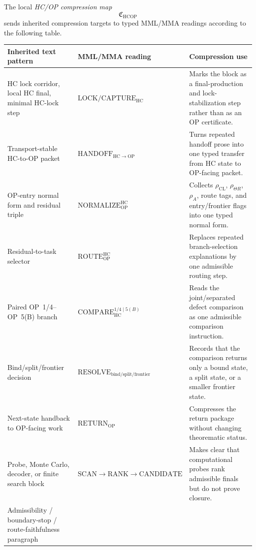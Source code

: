 \begin{definition}
\label{def:compression-map-from-inherited-text-to-mml-mma-operations}
The local \emph{HC/OP compression map}
\[
 \mathfrak C_{\mathrm{HCOP}}
\]
sends inherited compression targets to typed MML/MMA readings according to the following table.

{\small
\renewcommand{\arraystretch}{1.18}
\begin{longtable}{|P{0.28\textwidth}|P{0.24\textwidth}|P{0.36\textwidth}|}
\hline
\textbf{Inherited text pattern} & \textbf{MML/MMA reading} & \textbf{Compression use} \\
\hline
HC lock corridor, local HC final, minimal HC-lock step &
\(\mathrm{LOCK}/\mathrm{CAPTURE}_{\mathrm{HC}}\) &
Marks the block as a final-production and lock-stabilization step rather than as an OP certificate. \\
\hline
Transport-stable HC-to-OP packet &
\(\mathrm{HANDOFF}_{\mathrm{HC}\to\mathrm{OP}}\) &
Turns repeated handoff prose into one typed transfer from HC state to OP-facing packet. \\
\hline
OP-entry normal form and residual triple &
\(\mathrm{NORMALIZE}_{\mathrm{OP}}^{\mathrm{HC}}\) &
Collects \(\rho_{\mathrm{CL}}\), \(\rho_{\Theta R}\), \(\rho_A\), route tags, and entry/frontier flags into one typed normal form. \\
\hline
Residual-to-task selector &
\(\mathrm{ROUTE}_{\mathrm{OP}}^{\mathrm{HC}}\) &
Replaces repeated branch-selection explanations by one admissible routing step. \\
\hline
Paired OP~1/4--OP~5(B) branch &
\(\mathrm{COMPARE}_{\mathrm{HC}}^{1/4\mid 5(B)}\) &
Reads the joint/separated defect comparison as one admissible comparison instruction. \\
\hline
Bind/split/frontier decision &
\(\scriptstyle\mathrm{RESOLVE}_{\mathrm{bind/split/frontier}}\) &
Records that the comparison returns only a bound state, a split state, or a smaller frontier state. \\
\hline
Next-state handback to OP-facing work &
\(\mathrm{RETURN}_{\mathrm{OP}}\) &
Compresses the return package without changing theorematic status. \\
\hline
Probe, Monte Carlo, decoder, or finite search block &
\(\mathrm{SCAN}\to\mathrm{RANK}\to\mathrm{CANDIDATE}\) &
Makes clear that computational probes rank admissible finals but do not prove closure. \\
\hline
Admissibility / boundary-stop / route-faithfulness paragraph &

\end{longtable}}
\end{definition}
